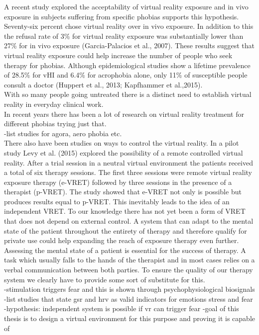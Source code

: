 A recent study explored the acceptability of virtual reality exposure and in vivo exposure in subjects suffering from specific phobias supports this hypothesis. Seventy-six percent chose virtual reality over in vivo exposure. In addition to this the refusal rate of 3\% for virtual reality exposure was substantially lower than 27\% for in vivo exposure (Garcia-Palacios et al., 2007). 
These results suggest that virtual reality exposure could help increase the number of people who seek therapy for phobias. Although epidemiological studies show a lifetime prevalence of 28.5\% for vHI and 6.4\% for acrophobia alone, only 11\% of susceptible people consult a doctor (Huppert et al., 2013; Kapfhammer et al.,2015).\\
With so many people going untreated there is a distinct need to establish virtual reality in everyday clinical work.\\
In recent years there has been a lot of research on virtual reality treatment for different phobias trying just that.\\
-list studies for agora, aero phobia etc.\\

There also have been studies on ways to control the virtual reality. In a pilot study Levy et al. (2015) explored the possibility of a remote controlled virtual reality. After a trial session in a neutral virtual environment the patients received a total of six therapy sessions. The first three sessions were remote virtual reality exposure therapy (e-VRET) followed by three sessions in the presence of a therapist (p-VRET). The study showed that e-VRET not only is possible but produces results equal to p-VRET. This inevitably leads to the idea of an independent VRET. To our knowledge there has not yet been a form of VRET that does not depend on external control. A system that can adapt to the mental state of the patient throughout the entirety of therapy and therefore qualify for private use could help expanding the reach of exposure therapy even further.
Assessing the mental state of a patient is essential for the success of therapy. A task which usually falls to the hands of the therapist and in most cases relies on a verbal communication between both parties.
To ensure the quality of our therapy system we clearly have to provide some sort of substitute for this.\\
-stimulation triggers fear and this is shown through psychophysiological biosignals\\
-list studies that state gsr and hrv as valid indicators for emotions stress and fear\\
-hypothesis: independent system is possible if vr can trigger fear
-goal of this thesis is to design a virtual environment for this purpose and proving it is capable of 



